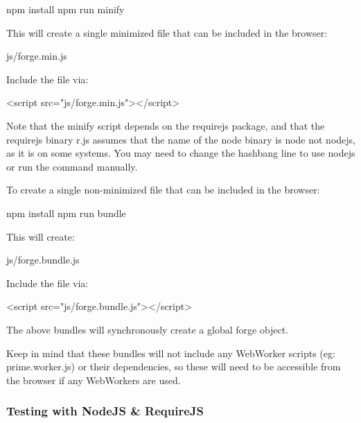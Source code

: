\begin{DoxyCode}
npm install
npm run minify
\end{DoxyCode}


This will create a single minimized file that can be included in the browser\+:


\begin{DoxyCode}
js/forge.min.js
\end{DoxyCode}


Include the file via\+:


\begin{DoxyCode}
<script src="js/forge.min.js"></script>
\end{DoxyCode}


Note that the minify script depends on the requirejs package, and that the requirejs binary \textquotesingle{}r.\+js\textquotesingle{} assumes that the name of the node binary is \textquotesingle{}node\textquotesingle{} not \textquotesingle{}nodejs\textquotesingle{}, as it is on some systems. You may need to change the hashbang line to use \textquotesingle{}nodejs\textquotesingle{} or run the command manually.

To create a single non-\/minimized file that can be included in the browser\+:


\begin{DoxyCode}
npm install
npm run bundle
\end{DoxyCode}


This will create\+:


\begin{DoxyCode}
js/forge.bundle.js
\end{DoxyCode}


Include the file via\+:


\begin{DoxyCode}
<script src="js/forge.bundle.js"></script>
\end{DoxyCode}


The above bundles will synchronously create a global \textquotesingle{}forge\textquotesingle{} object.

Keep in mind that these bundles will not include any Web\+Worker scripts (eg\+: prime.\+worker.\+js) or their dependencies, so these will need to be accessible from the browser if any Web\+Workers are used.

\subsubsection*{Testing with Node\+JS \& Require\+JS}

